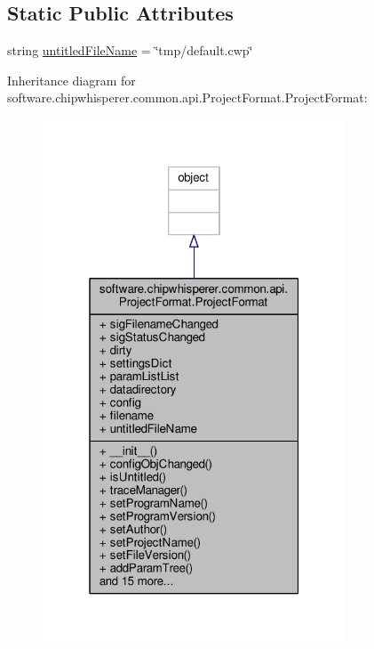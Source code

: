 \subsection*{Static Public Attributes}
\begin{DoxyCompactItemize}
\item 
string \hyperlink{classsoftware_1_1chipwhisperer_1_1common_1_1api_1_1ProjectFormat_1_1ProjectFormat_afc84733fff7c8d94a2466a08f6a4e23c}{untitled\+File\+Name} = \char`\"{}tmp/default.\+cwp\char`\"{}
\end{DoxyCompactItemize}


Inheritance diagram for software.\+chipwhisperer.\+common.\+api.\+Project\+Format.\+Project\+Format\+:\nopagebreak
\begin{figure}[H]
\begin{center}
\leavevmode
\includegraphics[width=256pt]{d6/dd6/classsoftware_1_1chipwhisperer_1_1common_1_1api_1_1ProjectFormat_1_1ProjectFormat__inherit__graph}
\end{center}
\end{figure}


